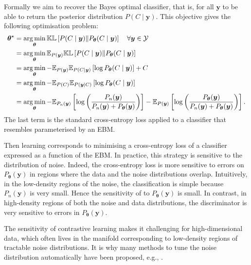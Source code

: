 Formally we aim to recover the Bayes optimal classifier, that is, for all $\mathbf{y}$ to be able to return the posterior distribution $P(C \mid \mathbf{y})$. This objective gives the following optimisation problem:
\begin{align}
  \bm{\theta}^\star &= \argmin_{\bm{\theta}} \mathbb{KL}\left[ P(C \mid \mathbf{y}) \Vert P_{\bm{\theta}}(C \mid \mathbf{y}) \right] \quad \forall \mathbf{y} \in \mathcal{Y}\\
  &=\argmin_{\bm{\theta}} \mathbb{E}_{P(\mathbf{y})}\mathbb{KL}\left[ P(C \mid \mathbf{y}) \Vert P_{\bm{\theta}}(C \mid \mathbf{y}) \right]\\
  &= \argmin_{\bm{\theta}} -\mathbb{E}_{P(\mathbf{y})}\mathbb{E}_{P(C \mid \mathbf{y})}\left[ \log P_{\bm{\theta}}(C \mid \mathbf{y}) \right] + C\\
  &= \argmin_{\bm{\theta}} -\mathbb{E}_{P(C)}\mathbb{E}_{P(\mathbf{y} \mid C)}\left[ \log P_{\bm{\theta}}(C \mid \mathbf{y}) \right]\\
  &= \argmin_{\bm{\theta}} -\mathbb{E}_{P_n(\mathbf{y})}\left[ \log \left( \frac{P_n(\mathbf{y})}{P_n(\mathbf{y}) + P_{\bm{\theta}}(\mathbf{y})} \right)  \right] -\mathbb{E}_{P(\mathbf{y})}\left[ \log \left( \frac{P_{\bm{\theta}}(\mathbf{y})}{P_n(\mathbf{y}) + P_{\bm{\theta}}(\mathbf{y})} \right) \right].
\end{align}
The last term is the standard cross-entropy loss applied to a classifier that resembles  parameterised by an EBM.

Then learning corresponds to minimising a cross-entropy loss of a classifier expressed as a function of the EBM. In practice, this strategy is sensitive to the distribution of noise. Indeed, the cross-entropy loss is more sensitive to errors on $P_{\bm{\theta}}(\bm{y})$ in regions where the data and the noise distributions overlap. Intuitively, in the low-density regions of the noise, the classification is simple because $P_n(\mathbf{y})$ is very small. Hence the sensitivity of  to $P_{\bm{\theta}}(\bm{y})$ is small. In contrast, in high-density regions of both the noise and data distributions, the discriminator is very sensitive to errors in $P_{\bm{\theta}}(\bm{y})$.

The sensitivity of contrastive learning makes it challenging for high-dimensional data, which often lives in the manifold corresponding to low-density regions of tractable noise distributions. It is why many methods to tune the noise distribution automatically have been proposed, e.g., \citep{bose2018adversarial, ceylan2018conditional, gao2020flow}.

